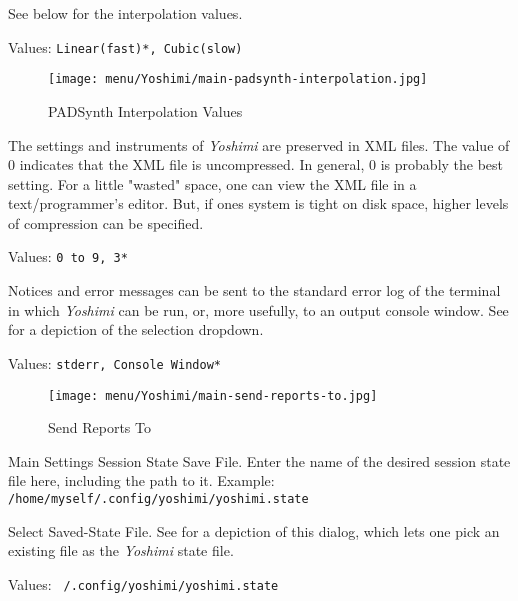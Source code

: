    See  below
   for the interpolation values.

   Values: \texttt{Linear(fast)*, Cubic(slow)}

\begin{figure}[H]
   \centering 
   \texttt{[image: menu/Yoshimi/main-padsynth-interpolation.jpg]}
   \caption[PADSynth Interpolation]{PADSynth Interpolation Values}
   \label{fig:padsynth_interpolation}
\end{figure}

   The settings and instruments of
   \textsl{Yoshimi}
   are preserved in XML files.
   The value of 0 indicates that the XML file is uncompressed.
   In general, 0 is probably the best setting.  For a little "wasted"
   space, one can view the XML file in a text/programmer's editor.
   But, if ones system is tight on disk space, higher levels of compression
   can be specified.

   Values: \texttt{0 to 9, 3*}

   Notices and error messages can be sent to the standard error log of
   the terminal in which 
   \textsl{Yoshimi} can be run, or, more usefully, to
   an output console window.
   See 
   for a depiction of the selection dropdown.

   Values: \texttt{stderr, Console Window*}

\begin{figure}[H]
   \centering 
   \texttt{[image: menu/Yoshimi/main-send-reports-to.jpg]}
   \caption[Send Reports]{Send Reports To}
   \label{fig:send_reports_to}
\end{figure}

   Main Settings Session State Save File.
   Enter the name of the desired session state file here, including
   the path to it.
   Example: \texttt{/home/myself/.config/yoshimi/yoshimi.state}

   Select Saved-State File.
   See 
   for a depiction of this dialog, which lets one pick an existing file as
   the \textsl{Yoshimi} state file.

   Values: \texttt{~/.config/yoshimi/yoshimi.state}

